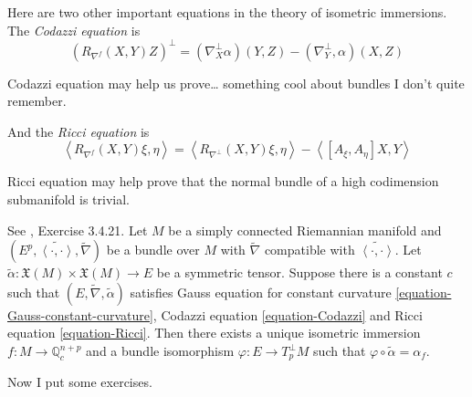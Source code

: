 \documentclass{book}
\begin{document}
\medskip\noindent

Here are two other important equations in the
theory of isometric immersions.
The {\it Codazzi equation} is
\begin{equation}
\label{equation-Codazzi}
(R_{\nabla^f}(X,Y)Z)^\perp
=(\nabla^\perp_X\alpha)(Y,Z)-(\nabla^\perp_Y,
\alpha)(X,Z)
\end{equation}

Codazzi equation may help us prove… something
cool about bundles I don't quite
remember.

And the {\it Ricci equation} is
\begin{equation}
\label{equation-Ricci}
\left\langle{}R_{\nabla^f}(X,Y)\xi,\eta\right\rangle{}
=\left\langle{}R_{\nabla^\perp}(X,Y)\xi,\eta\right\rangle{}
-\left\langle{}[A_\xi,A_\eta]X,Y\right\rangle{}
\end{equation}

Ricci equation may help prove that the normal
bundle of a high codimension
submanifold is trivial.

\begin{theorem}
\label{theorem-funda-theor-subma}
See \cite{pet}, Exercise 3.4.21. Let $M$ be a
simply connected Riemannian
manifold and
$(E^p,\widetilde{\left\langle{}\cdot,\cdot\right\rangle{}},
\tilde{\nabla})$
be a
bundle over $M$ with $\tilde{\nabla}$
compatible with
$\widetilde{\left\langle{}\cdot,\cdot\right\rangle{}}$.
Let $\tilde{\alpha}:\mathfrak{X}(M)\times
\mathfrak{X}(M)\to E$ be a symmetric
tensor. Suppose there is a constant $c$ such
that
$(E,\tilde{\nabla},\tilde{\alpha})$ satisfies
Gauss equation for constant
curvature
\ref{equation-Gauss-constant-curvature},
Codazzi equation
\ref{equation-Codazzi} and Ricci equation
\ref{equation-Ricci}.
Then there exists a unique isometric
immersion $f:M \to \mathbb{Q}_c^{n+p}$ and a
bundle isomorphism $\varphi:E \to
T^\perp_pM$ such that
$\varphi\circ\tilde{\alpha}=\alpha_f$.
\end{theorem}

\medskip\noindent
Now I put some exercises.
\end{document}
